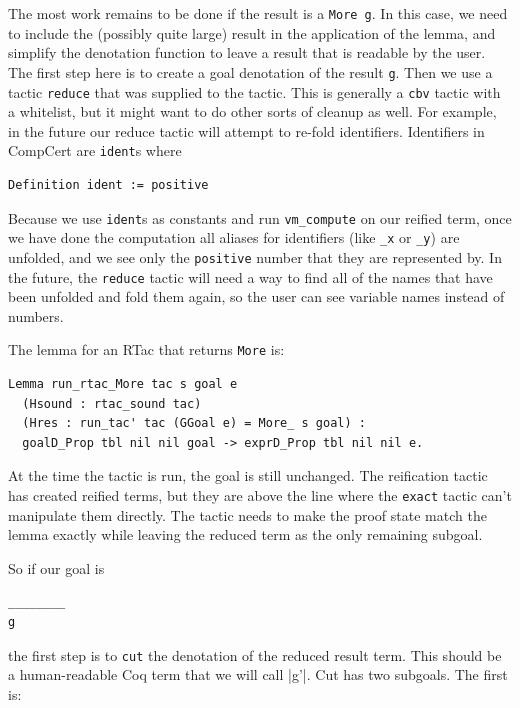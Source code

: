 \documentclass{puthesis}
\begin{document}
 The most work remains to be done if the result is a
\lstinline|More g|. In this case, we need to include the (possibly quite
large) result in the application of the lemma, and simplify the
denotation function to leave a result that is readable by the user. 
The first step here is to create a goal denotation of the result
\lstinline|g|. Then we use a tactic \lstinline|reduce| that was
supplied to the tactic. This is generally a \lstinline|cbv| tactic
with a whitelist, but it might want to do other sorts of cleanup as
well. For example, in the future our reduce tactic will attempt to
re-fold identifiers. Identifiers in CompCert are \lstinline|ident|s
where 

\begin{lstlisting}
Definition ident := positive
\end{lstlisting}

Because we use \lstinline|ident|s as constants and run
\lstinline|vm_compute| on our reified term, once we have done the
computation all aliases for identifiers (like \lstinline|_x| or
\lstinline|_y|) are unfolded, and we see only the \lstinline|positive|
number that they are represented by. In the future, the
\lstinline|reduce| tactic will need a way to find all of the names
that have been unfolded and fold them again, so the user can see
variable names instead of numbers. 

The lemma for an RTac that returns \lstinline|More| is:

\begin{lstlisting}
Lemma run_rtac_More tac s goal e
  (Hsound : rtac_sound tac) 
  (Hres : run_tac' tac (GGoal e) = More_ s goal) :
  goalD_Prop tbl nil nil goal -> exprD_Prop tbl nil nil e.
\end{lstlisting}

At the time the tactic is run, the goal is still unchanged. The
reification tactic has created reified terms, but they are above the
line where the \lstinline|exact| tactic can't manipulate them
directly. The tactic needs to make the proof state match the lemma
exactly while leaving the reduced term as the only remaining
subgoal.

So if our goal is 

\begin{lstlisting}
________
g
\end{lstlisting}

the first step is to \lstinline|cut| the denotation of the reduced
result term. This should be a human-readable Coq term that we will
call \lstlisting|g'|. Cut has two subgoals. The first is:
\end{document}

